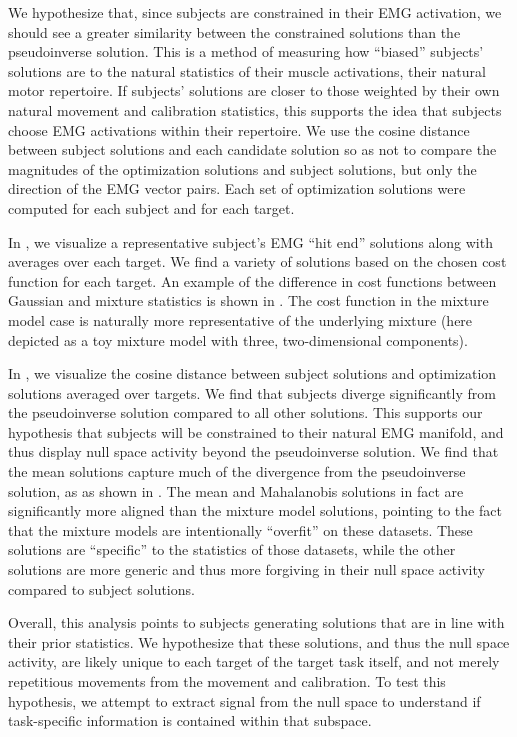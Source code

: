 \documentclass[../main.tex]{subfiles}
\begin{document}
    We hypothesize that, since subjects are constrained in their EMG activation, we should see a greater similarity between the constrained solutions than the pseudoinverse solution. This is a method of measuring how ``biased'' subjects' solutions are to the natural statistics of their muscle activations, their natural motor repertoire. If subjects' solutions are closer to those weighted by their own natural movement and calibration statistics, this supports the idea that subjects choose EMG activations within their repertoire. We use the cosine distance between subject solutions and each candidate solution so as not to compare the magnitudes of the optimization solutions and subject solutions, but only the direction of the EMG vector pairs. Each set of optimization solutions were computed for each subject and for each target.
    
    In , we visualize a representative subject's EMG ``hit end'' solutions along with averages over each target. We find a variety of solutions based on the chosen cost function for each target. An example of the difference in cost functions between Gaussian and mixture statistics is shown in . The cost function in the mixture model case is naturally more representative of the underlying mixture (here depicted as a toy mixture model with three, two-dimensional components).
    
    In , we visualize the cosine distance between subject solutions and optimization solutions averaged over targets. We find that subjects diverge significantly from the pseudoinverse solution compared to all other solutions. This supports our hypothesis that subjects will be constrained to their natural EMG manifold, and thus display null space activity beyond the pseudoinverse solution. We find that the mean solutions capture much of the divergence from the pseudoinverse solution, as as shown in . The mean and Mahalanobis solutions in fact are significantly more aligned than the mixture model solutions, pointing to the fact that the mixture models are intentionally ``overfit'' on these datasets. These solutions are ``specific'' to the statistics of those datasets, while the other solutions are more generic and thus more forgiving in their null space activity compared to subject solutions. 
    
    Overall, this analysis points to subjects generating solutions that are in line with their prior statistics. We hypothesize that these solutions, and thus the null space activity, are likely unique to each target of the target task itself, and not merely repetitious movements from the movement and calibration. To test this hypothesis, we attempt to extract signal from the null space to understand if task-specific information is contained within that subspace.
  
\end{document}

